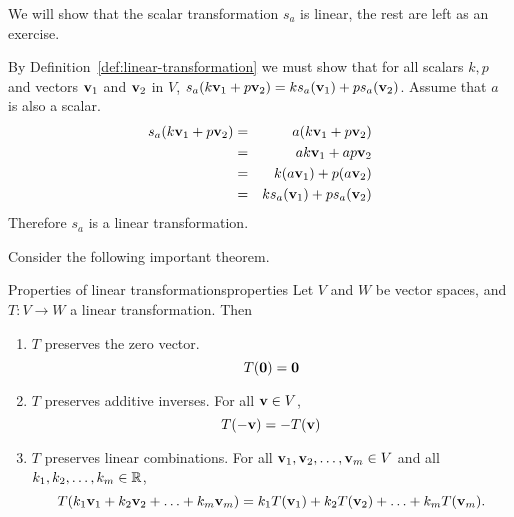\begin{solution}
  We will show that the scalar transformation $s_a$ is linear, the
  rest are left as an exercise.

  By Definition~\ref{def:linear-transformation} we must show that for
  all scalars $k ,p $ and vectors $\mbox{\bf v}_1$ and $\mbox{\bf v}_2$ in
  $V$,
  $s_a(k \mbox{\bf v}_1 + p \mbox{\bf v}_2) = k s_a(\mbox{\bf v}_1)+ p
  s_a(\mbox{\bf v}_{2})$. Assume that $a$ is also a scalar.
  \begin{eqnarray*}
    s_a(k \mbox{\bf v}_1 + p \mbox{\bf v}_2)
    &=& a (k \mbox{\bf v}_1 + p \mbox{\bf v}_2) \\
    &=&  ak \mbox{\bf v}_1 + ap \mbox{\bf v}_2  \\
    &=&  k (a \mbox{\bf v}_1) + p(a \mbox{\bf v}_2)  \\
    &=& k s_a(\mbox{\bf v}_1)  + p s_a (\mbox{\bf v}_2)
  \end{eqnarray*}
  Therefore $s_a$ is a linear transformation.
\end{solution}

Consider the following important theorem.

\begin{theorem}{Properties of linear transformations}{properties}
  Let $V$ and $W$ be vector spaces, and $T:V \to W$ a linear
  transformation.  Then
  \begin{enumerate}
  \item $T$ preserves the zero vector.
    \begin{equation*}
      T(\mbox{\bf 0})=\mbox{\bf 0}
    \end{equation*}
  \item $T$ preserves additive inverses.
    For all $\mbox{\bf v}\in V$,
    \begin{equation*}
      T(-\mbox{\bf v})= -T(\mbox{\bf v})
    \end{equation*}
  \item $T$ preserves linear combinations.
    For all $\mbox{\bf v}_1, \mbox{\bf v}_2, \ldots, \mbox{\bf v}_m \in V$ and
    all $k_1, k_2, \ldots, k_m\in\mathbb{R}$,
    \begin{equation*}
      T(k_1\mbox{\bf v}_1 + k_2\mbox{\bf v}_2 + \ldots + k_m\mbox{\bf v}_m)
      = k_1T(\mbox{\bf v}_1) + k_2T(\mbox{\bf v}_2) + \ldots + k_mT(\mbox{\bf v}_m).
    \end{equation*}
  \end{enumerate}
\end{theorem}

